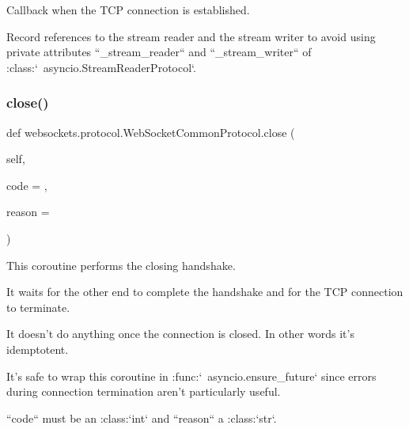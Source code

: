 \begin{DoxyVerb}Callback when the TCP connection is established.

Record references to the stream reader and the stream writer to avoid
using private attributes ``_stream_reader`` and ``_stream_writer`` of
:class:`~asyncio.StreamReaderProtocol`.\end{DoxyVerb}
 \mbox{\label{classwebsockets_1_1protocol_1_1_web_socket_common_protocol_a0ff205f28fde8948f321c8115696fea5}} 
\subsubsection{\texorpdfstring{close()}{close()}}
{\footnotesize\ttfamily def websockets.\+protocol.\+Web\+Socket\+Common\+Protocol.\+close (\begin{DoxyParamCaption}\item[{}]{self,  }\item[{}]{code = {},  }\item[{}]{reason = {\ttfamily \textquotesingle{}\textquotesingle{}} }\end{DoxyParamCaption})}

\begin{DoxyVerb}This coroutine performs the closing handshake.

It waits for the other end to complete the handshake and for the TCP
connection to terminate.

It doesn't do anything once the connection is closed. In other words
it's idemptotent.

It's safe to wrap this coroutine in :func:`~asyncio.ensure_future`
since errors during connection termination aren't particularly useful.

``code`` must be an :class:`int` and ``reason`` a :class:`str`.\end{DoxyVerb}
 \mbox{\label{classwebsockets_1_1protocol_1_1_web_socket_common_protocol_ab93f2de9e4d230c3651683245140f55a}} 
